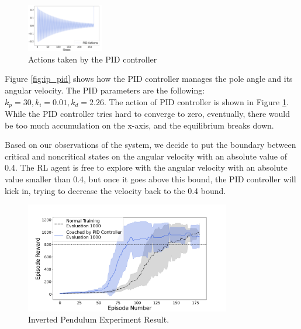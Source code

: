 \documentclass[AMS,STIX1COL]{WileyNJD-v2}
\begin{document}
\begin{figure}
  \centering
  \includegraphics[width=0.3\textwidth]{ip_PID_actions}
  \caption{Actions taken by the PID controller}
  \label{fig:ip_pid_actions}
\end{figure} 

Figure \ref{fig:ip_pid} shows how the PID controller manages the pole angle and its angular velocity. The PID parameters are the following: $k_p=30,k_i=0.01,k_d=2.26$. The action of PID controller is shown in Figure \ref{fig:ip_pid_actions}. While the PID controller tries hard to converge to zero, eventually, there would be too much accumulation on the x-axis, and the equilibrium breaks down.

Based on our observations of the system, we decide to put the boundary between critical and noncritical states on the angular velocity with an absolute value of 0.4. The RL agent is free to explore with the angular velocity with an absolute value smaller than 0.4, but once it goes above this bound, the PID controller will kick in, trying to decrease the velocity back to the 0.4 bound.

\begin{figure}
\centering
\includegraphics[width=0.8\textwidth]{ip.png}
\caption{Inverted Pendulum Experiment Result. }
\label{fig:ip_result}
\end{figure}
\end{document}
